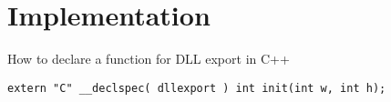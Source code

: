 \chapter{Implementation}
\begin{listing}[H]
	\caption{How to declare a function for DLL export in C++}
	\label{listing:dllExport}
	\begin{verbatim}
extern "C" __declspec( dllexport ) int init(int w, int h);
	\end{verbatim}
\end{listing}